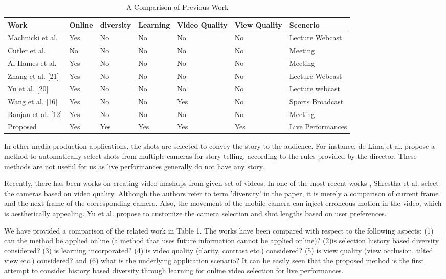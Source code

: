 \documentclass{sig-alternate}
\begin{document}
\begin{table}
\centering
\caption{ A Comparison of Previous Work }
\begin{tabular}{p{3.2cm}|p{2cm}|p{2cm}|p{2cm}|p{2cm}|p{2cm}|p{3.2cm}} \hline
Work&Online&diversity&Learning&Video Quality &View Quality&Scenerio\\ \hline
Machnicki et al.\cite{clayton1987materials}&Yes&No&No&No&No&Lecture Webcast\\ \hline
Cutler et al.\cite{paddle2006effect}&No&No&No&No&No&Meeting\\ \hline
Al-Hames et al.\cite{wyszecki1982color} &Yes& No& No& No& No& Meeting\\ \hline
Zhang et al. [21] &Yes &No &No &No &No &Lecture Webcast\\ \hline
Yu et al. [20] &Yes &No &No &No &No &Lecture webcast\\ \hline
Wang et al. [16] &Yes &No &No &Yes &No &Sports Broadcast\\ \hline
Ranjan et al. [12] &Yes &No &No &No &No &Meeting\\ \hline
Proposed &Yes &Yes &Yes &Yes& Yes &Live Performances\\ \hline
\end{tabular}
\end{table}

 In other media production applications, the shots are selected to convey the story to the audience. For instance, de Lima et al. \cite{paddle2006effect} propose a method to automatically select shots from multiple cameras for story telling, according to the rules provided by the director. These methods are not useful for us as live performances generally do not have any story. 

 Recently, there has been works on creating video mashups from given set of videos. In one of the most recent works \cite{economou1983green}, Shrestha et al. select the cameras based on video quality. Although the authors refer to term 'diversity' in the paper, it is merely a comparison of current frame and the next frame of the corresponding camera. Also, the movement of the mobile camera can inject erroneous motion in the video, which is aesthetically appealing. Yu et al. \cite{wyszecki1982color} propose to customize the camera selection and shot lengths based on user preferences.

 We have provided a comparison of the related work in Table 1. The works have been compared with respect to the following aspects: (1) can the method be applied online (a method that uses future information cannot be applied online)? (2)is selection history based diversity considered? (3) is learning incorporated? (4) is video quality (clarity, contrast etc.) considered? (5) is view quality (view occlusion, tilted view etc.) considered? and (6) what is the underlying application scenario? It can be easily seen that the proposed method is the ﬁrst attempt to consider history based diversity through learning for online video selection for live performances.
\end{document}
